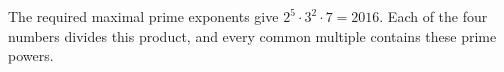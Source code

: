 The required maximal prime exponents give $2^5\cdot3^2\cdot7=\boxed{2016}$. Each of the four numbers divides this product, and every common multiple contains these prime powers.
